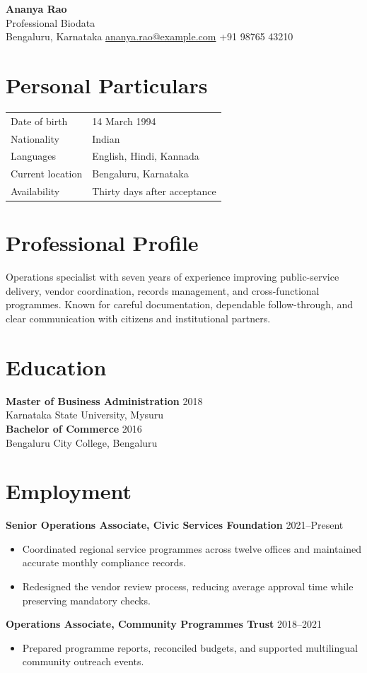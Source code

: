 \documentclass[11pt,a4paper]{article}
\begin{document}
\begin{center}
  {\LARGE\textbf{Ananya Rao}}\\[3pt]
  Professional Biodata\\[2pt]
  Bengaluru, Karnataka \quad
  \href{mailto:ananya.rao@example.com}{ananya.rao@example.com} \quad
  +91 98765 43210
\end{center}

\section{Personal Particulars}
\begin{tabular}{@{}p{}p{}@{}}
Date of birth & 14 March 1994 \\
Nationality & Indian \\
Languages & English, Hindi, Kannada \\
Current location & Bengaluru, Karnataka \\
Availability & Thirty days after acceptance \\
\end{tabular}

\section{Professional Profile}
Operations specialist with seven years of experience improving public-service
delivery, vendor coordination, records management, and cross-functional
programmes. Known for careful documentation, dependable follow-through, and
clear communication with citizens and institutional partners.

\section{Education}
\textbf{Master of Business Administration} \hfill 2018\\
Karnataka State University, Mysuru\\[3pt]
\textbf{Bachelor of Commerce} \hfill 2016\\
Bengaluru City College, Bengaluru

\section{Employment}
\textbf{Senior Operations Associate, Civic Services Foundation} \hfill 2021--Present
\begin{itemize}
  \item Coordinated regional service programmes across twelve offices and maintained accurate monthly compliance records.
  \item Redesigned the vendor review process, reducing average approval time while preserving mandatory checks.
\end{itemize}
\textbf{Operations Associate, Community Programmes Trust} \hfill 2018--2021
\begin{itemize}
  \item Prepared programme reports, reconciled budgets, and supported multilingual community outreach events.
\end{itemize}
\end{document}
